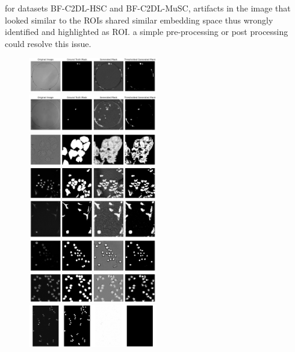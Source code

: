 \documentclass[./dissertation.tex]{subfiles}
\begin{document}
for datasets BF-C2DL-HSC and BF-C2DL-MuSC, artifacts in the image that looked similar to the ROIs shared similar embedding space thus wrongly identified and highlighted as ROI. a simple pre-processing or post processing could resolve this issue.

\begin{figure}
    \includegraphics[width=0.5\textwidth]{./figures/cc/BF-C2DL-HSC.png}
    \includegraphics[width=0.5\textwidth]{./figures/cc/BF-C2DL-MuSC.png}
    \includegraphics[width=0.5\textwidth]{./figures/cc/DIC-C2DH-HeLa.png}
    \includegraphics[width=0.5\textwidth]{./figures/cc/Fluo-C2DL-Huh7.png}
    \includegraphics[width=0.5\textwidth]{./figures/cc/Fluo-C2DL-MSC.png}
    \includegraphics[width=0.5\textwidth]{./figures/cc/Fluo-N2DH-GOWT1.png}
    \includegraphics[width=0.5\textwidth]{./figures/cc/Fluo-N2DH-SIM+.png}
    \includegraphics[width=0.5\textwidth]{./figures/cc/Fluo-N2DL-HeLa.png}

\end{figure}
\end{document}
